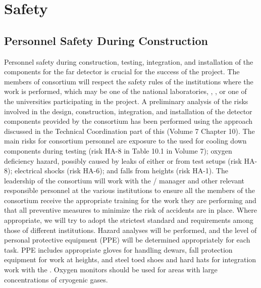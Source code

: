 \section{Safety}
\label{sec:fdsp-tpcelec-safety}


\subsection{Personnel Safety During Construction}
\label{sec:fdsp-tpcelec-safety-personnel}

Personnel safety during construction, testing, integration,
and installation of the  components for the 
 far detector is crucial for the success
of the project. The members of  consortium will
respect the safety rules of the institutions where the work is
performed, which may be one of the national laboratories, , ,
or one of the universities participating in the project. A
preliminary analysis of the risks involved in the design,
construction, integration, and installation of the detector
components provided by the  consortium has been
performed using the approach discussed in the Technical
Coordination part of this  (Volume 7 Chapter 10). %
The main risks for consortium personnel are exposure to
the \lntwo used for cooling down components during testing (risk HA-8
in Table 10.1 in Volume 7);
oxygen deficiency hazard, possibly caused by leaks
of either \lntwo or  from test setups (risk HA-8);
electrical shocks (risk HA-6); and falls from heights (risk HA-1). The leadership of the
 consortium will work with the /
 manager and other relevant responsible personnel at the
various institutions to ensure all the members of the
consortium receive the appropriate training for the work they
are performing and that all preventive measures to minimize
the risk of accidents are in place. Where appropriate,
we will try to adopt the strictest standard and requirements among
those of different institutions. Hazard analyses will be performed,
and the level of personal protective equipment (PPE)  will be determined
appropriately for each task. PPE includes 
appropriate gloves for handling \lntwo dewars, fall
protection equipment for work at heights, and steel toed shoes and
hard hats for integration work with the . Oxygen
monitors should be used for areas with large concentrations of
cryogenic gases.


